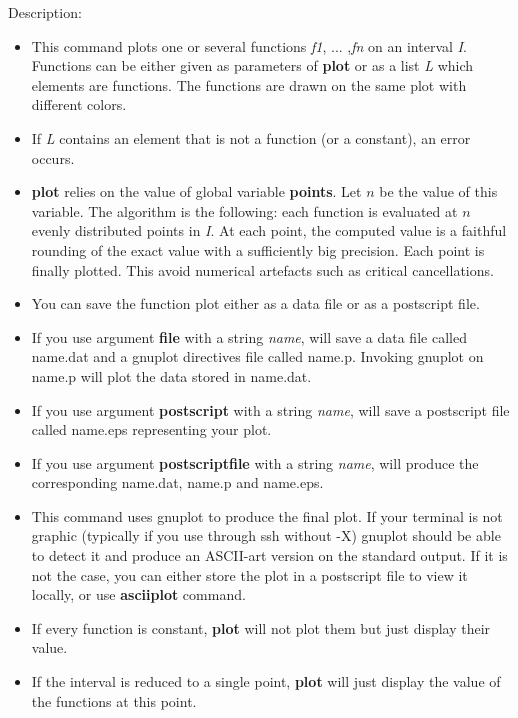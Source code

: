 \noindent Description: \begin{itemize}

\item This command plots one or several functions \emph{f1}, ... ,\emph{fn} on an interval \emph{I}.
   Functions can be either given as parameters of \textbf{plot} or as a list \emph{L}
   which elements are functions.
   The functions are drawn on the same plot with different colors.

\item If \emph{L} contains an element that is not a function (or a constant), an error
   occurs.

\item \textbf{plot} relies on the value of global variable \textbf{points}. Let $n$ be the 
   value of this variable. The algorithm is the following: each function is 
   evaluated at $n$ evenly distributed points in \emph{I}. At each point, the 
   computed value is a faithful rounding of the exact value with a sufficiently
   big precision. Each point is finally plotted.
   This avoid numerical artefacts such as critical cancellations.

\item You can save the function plot either as a data file or as a postscript file.

\item If you use argument \textbf{file} with a string \emph{name}, \sollya will save a data file
   called name.dat and a gnuplot directives file called name.p. Invoking gnuplot
   on name.p will plot the data stored in name.dat.

\item If you use argument \textbf{postscript} with a string \emph{name}, \sollya will save a 
   postscript file called name.eps representing your plot.

\item If you use argument \textbf{postscriptfile} with a string \emph{name}, \sollya will 
   produce the corresponding name.dat, name.p and name.eps.

\item This command uses gnuplot to produce the final plot.
   If your terminal is not graphic (typically if you use \sollya through 
   ssh without -X)
   gnuplot should be able to detect it and produce an ASCII-art version on the
   standard output. If it is not the case, you can either store the plot in a
   postscript file to view it locally, or use \textbf{asciiplot} command.

\item If every function is constant, \textbf{plot} will not plot them but just display
   their value.

\item If the interval is reduced to a single point, \textbf{plot} will just display the
   value of the functions at this point.
\end{itemize}
